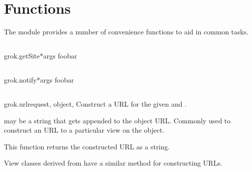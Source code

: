 \chapter{Functions}

The  module provides a number of convenience functions to aid in
common tasks.

  \section{}

    \begin{funcdesc}{grok.getSite}{*args}
    foobar
    \end{funcdesc}

  \section{}

    \begin{funcdesc}{grok.notify}{*args}
    foobar
    \end{funcdesc}

  \section{}

    \begin{funcdesc}{grok.url}{request, object, }
    Construct a URL for the given  and .

     may be a string that gets appended to the object URL. Commonly
    used to construct an URL to a particular view on the object.

    This function returns the constructed URL as a string.

    \begin{seealso}
      View classes derived from  have a similar 
      method for constructing URLs.
    \end{seealso}
    \end{funcdesc}
